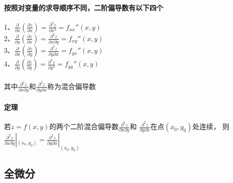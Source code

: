 \documentclass{article}
\begin{document}
\begin{flushleft}
	\paragraph{按照对变量的求导顺序不同，二阶偏导数有以下四个}
	1、$\frac{\partial}{\partial x}(\frac{\partial z}{\partial x})=
	\frac{\partial^2z}{\partial x^2}=f_{xx}''(x,y)$\\
	2、$\frac{\partial}{\partial y}(\frac{\partial z}{\partial x})=
	\frac{\partial^2z}{\partial x\partial y}=f_{xy}''(x,y)$\\
	3、$\frac{\partial}{\partial x}(\frac{\partial z}{\partial y})=
	\frac{\partial^2z}{\partial y\partial x}=f_{yx}''(x,y)$\\
	4、$\frac{\partial}{\partial y}(\frac{\partial z}{\partial y})=
	\frac{\partial^2z}{\partial y^2}=f_{yy}''(x,y)$\\
	~\\
	其中$\frac{\partial^2z}{\partial x\partial y}$和$\frac{\partial^2z}{\partial y\partial x}$称为混合偏导数\\
	
	\paragraph{定理}
	若$z=f(x,y)$的两个二阶混合偏导数$\frac{\partial^2z}{\partial x\partial y}$和
	$\frac{\partial^2z}{\partial y\partial x}$在点$(x_0,y_0)$处连续，
	则$\frac{\partial^2z}{\partial x\partial y}|_{(x_0,y_0)}=
	\frac{\partial^2z}{\partial y\partial x}|_{(x_0,y_0)}$\\
	
	\subsection{全微分}
	
	
	
\end{flushleft}
\end{document}
